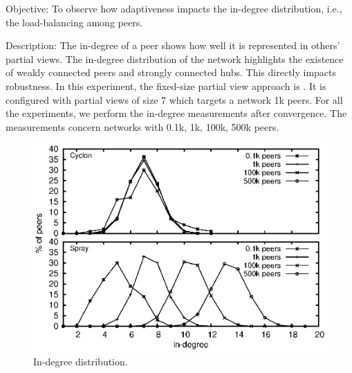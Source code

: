 \begin{asparadesc}
\item[Objective:] To observe how adaptiveness impacts the in-degree
  distribution, i.e., the load-balancing among peers.
\item[Description:] The in-degree of a peer shows how well it is
  represented in others' partial views. The in-degree distribution of
  the network highlights the existence of weakly connected peers and
  strongly connected hubs. This directly impacts robustness. In this
  experiment, the fixed-size partial view approach is \CYCLON{}. It is
  configured with partial views of size $7$ which targets a network 1k
  peers.  For all the experiments, we perform the in-degree
  measurements after convergence. The measurements concern networks
  with 0.1k, 1k, 100k, 500k peers.

\begin{figure}
  \centering
  \includegraphics[width=\SCALE\textwidth]{img/histo.eps}
  \caption{\label{fig:histo}In-degree distribution.}
\end{figure}


\end{asparadesc}
